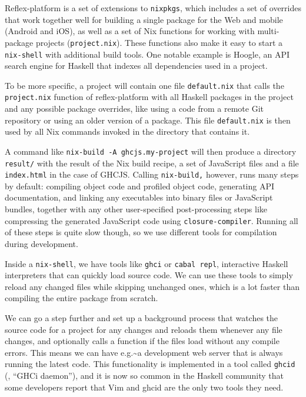 \documentclass[english,odsaz]{fitthesis}
\begin{document}
Reflex-platform is a set of extensions to \texttt{nixpkgs}, which includes a set of
overrides that work together well for building a single package for the Web and
mobile (Android and iOS), as well as a set of Nix functions for working with
multi-package projects (\texttt{project.nix}). These functions also make it easy to start
a \texttt{nix-shell} with additional build tools. One notable example is Hoogle, an API
search engine for Haskell that indexes all dependencies used in a project.

To be more specific, a project will contain one file \texttt{default.nix} that calls the
\texttt{project.nix} function of reflex-platform with all Haskell packages in the project
and any possible package overrides, like using a code from a remote Git
repository or using an older version of a package. This file \texttt{default.nix} is then
used by all Nix commands invoked in the directory that contains it.

A command like \texttt{nix-build -A ghcjs.my-project} will then produce a directory
\texttt{result/} with the result of the Nix build recipe, a set of JavaScript files and a
file \texttt{index.html} in the case of GHCJS. Calling \texttt{nix-build,} however, runs many steps
by default: compiling object code and profiled object code, generating API
documentation, and linking any executables into binary files or JavaScript
bundles, together with any other user-specified post-processing steps like
compressing the generated JavaScript code using \texttt{closure-compiler}. Running all of
these steps is quite slow though, so we use different tools for compilation
during development.

Inside a \texttt{nix-shell}, we have tools like \texttt{ghci} or \texttt{cabal repl}, interactive Haskell
interpreters that can quickly load source code. We can use these tools to simply
reload any changed files while skipping unchanged ones, which is a lot faster
than compiling the entire package from scratch.

We can go a step further and set up a background process that watches the source
code for a project for any changes and reloads them whenever any file changes,
and optionally calls a function if the files load without any compile
errors. This means we can have e.g.\textasciitilde{}a development web server that is always
running the latest code. This functionality is implemented in a tool called
\texttt{ghcid} (\cite{ghcid}, ``GHCi daemon''), and it is now so common in the Haskell
community that some developers report that Vim and ghcid are the only two tools
they need.
\end{document}
